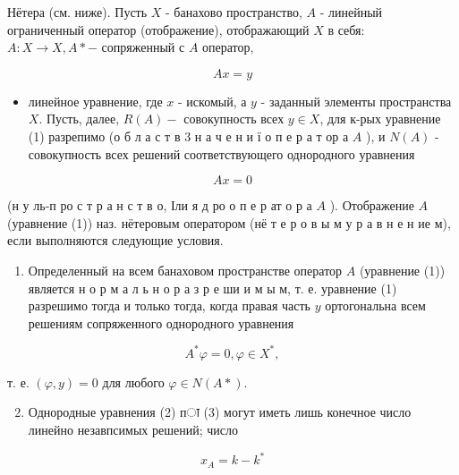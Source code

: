 \documentclass[10pt]{article}
\begin{document}
Нётера (см. ниже). Пусть $X$ - банахово пространство, $A$ - линейный ограниченный оператор (отображение), отображающий $X$ в себя: $A: X \rightarrow X, A *-$ сопряженный с $A$ оператор,



\[

A x=y

\]



\begin{itemize}

  \item линейное уравнение, где $x$ - искомый, а $y$ - заданный элементы пространства $X$. Пусть, далее, $R(A)-$ совокупность всех $y \in X$, для к-рых уравнение (1) разрепимо (о б л а с т в 3 н а ч е н и ї о п е р а т ор а $A$ ), и $N(A)$ - совокупность всех решений соответствующего однородного уравнения

\end{itemize}



\[

A x=0

\]



(н у ль-п ро с т р а н с т в о, Іли я д ро о п е р ат о р а $A$ ). Отображение $A$ (уравнение (1)) наз. нётеровым оператором (нё т е р о в ы м у р а в н е н ие м), если выполняются следующие условия.



\begin{enumerate}

  \item Определенный на всем банаховом пространстве оператор $A$ (уравнение (1)) является н о р м а л ь н о р а з р е ши и м ы м, т. е. уравнение (1) разрешимо тогда и только тогда, когда правая часть $y$ ортогональна всем решениям сопряженного однородного уравнения

\end{enumerate}



\[

A^{*} \varphi=0, \varphi \in X^{*},

\]



т. е. $(\varphi, y)=0$ для любого $\varphi \in N(A *)$.



\begin{enumerate}

  \setcounter{enumi}{1}

  \item Однородные уравнения (2) пा (3) могут иметь лишь конечное число линейно незавпсимых решений; число

\end{enumerate}



\[

x_{A}=k-k^{*}

\]
\end{document}
